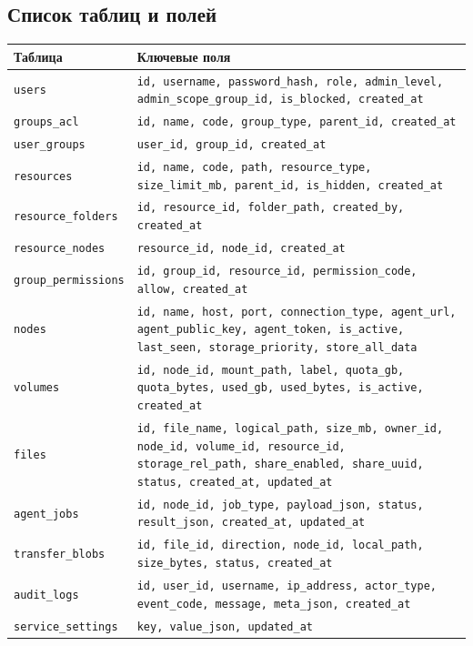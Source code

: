 \documentclass[14pt,a4paper]{extarticle}
\begin{document}
\subsection{Список таблиц и полей}
\begin{longtable}{|p{4.3cm}|p{9.2cm}|}
\hline
\textbf{Таблица} & \textbf{Ключевые поля} \\
\hline
\texttt{users} & \texttt{id, username, password\_hash, role, admin\_level, admin\_scope\_group\_id, is\_blocked, created\_at} \\
\hline
\texttt{groups\_acl} & \texttt{id, name, code, group\_type, parent\_id, created\_at} \\
\hline
\texttt{user\_groups} & \texttt{user\_id, group\_id, created\_at} \\
\hline
\texttt{resources} & \texttt{id, name, code, path, resource\_type, size\_limit\_mb, parent\_id, is\_hidden, created\_at} \\
\hline
\texttt{resource\_folders} & \texttt{id, resource\_id, folder\_path, created\_by, created\_at} \\
\hline
\texttt{resource\_nodes} & \texttt{resource\_id, node\_id, created\_at} \\
\hline
\texttt{group\_permissions} & \texttt{id, group\_id, resource\_id, permission\_code, allow, created\_at} \\
\hline
\texttt{nodes} & \texttt{id, name, host, port, connection\_type, agent\_url, agent\_public\_key, agent\_token, is\_active, last\_seen, storage\_priority, store\_all\_data} \\
\hline
\texttt{volumes} & \texttt{id, node\_id, mount\_path, label, quota\_gb, quota\_bytes, used\_gb, used\_bytes, is\_active, created\_at} \\
\hline
\texttt{files} & \texttt{id, file\_name, logical\_path, size\_mb, owner\_id, node\_id, volume\_id, resource\_id, storage\_rel\_path, share\_enabled, share\_uuid, status, created\_at, updated\_at} \\
\hline
\texttt{agent\_jobs} & \texttt{id, node\_id, job\_type, payload\_json, status, result\_json, created\_at, updated\_at} \\
\hline
\texttt{transfer\_blobs} & \texttt{id, file\_id, direction, node\_id, local\_path, size\_bytes, status, created\_at} \\
\hline
\texttt{audit\_logs} & \texttt{id, user\_id, username, ip\_address, actor\_type, event\_code, message, meta\_json, created\_at} \\
\hline
\texttt{service\_settings} & \texttt{key, value\_json, updated\_at} \\
\hline
\end{longtable}
\end{document}
